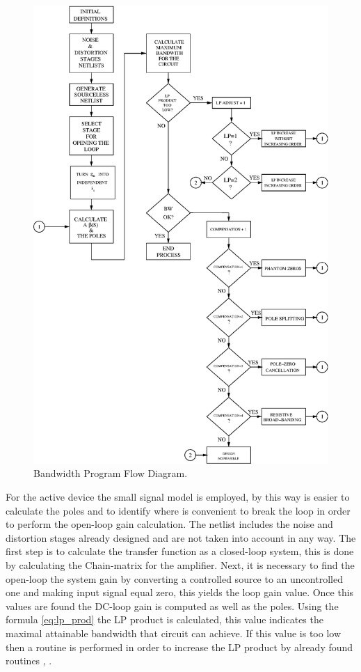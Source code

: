 \documentclass[conference]{IEEEtran}
\begin{document}
\begin{figure}[hbtp]
	\centering
	\includegraphics[scale=.5]{figures/bw_diagram.eps}
	\caption{Bandwidth Program Flow Diagram.}
	\label{fig:flow_diagram}
\end{figure}


For the active device the small signal model is employed, by this way is easier to calculate the poles and to identify where is convenient to break the loop in order to perform the open-loop gain calculation. The netlist includes the noise and distortion stages already designed and are not taken into account in any way. The first step is to calculate the transfer function as a closed-loop system, this is done by calculating the Chain-matrix for the amplifier. Next, it is necessary to find the open-loop the system gain by converting a controlled source to an uncontrolled one and making input signal equal zero, this yields the loop gain value. Once this values are found the DC-loop gain is computed as well as the poles. Using the formula \ref{eq:lp_prod} the LP product is calculated, this value indicates the maximal attainable bandwidth that circuit can achieve. If this value is too low then a routine is performed in order to increase the LP product by already found routines \cite{verhoeven}, \cite{nordholt}. 
\end{document}
